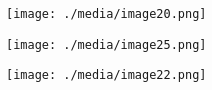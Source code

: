 \documentclass[12pt]{article}
\renewcommand{\_}{\kern-1.5pt\textunderscore\kern-1.5pt}
\begin{document}

\par


\vspace{\baselineskip}

\vspace{\baselineskip}



\begin{figure}[H]
	\begin{FlushLeft}		\texttt{[image: ./media/image20.png]}
	\end{FlushLeft}\end{figure}



\par


\vspace{\baselineskip}

\vspace{\baselineskip}



\begin{figure}[H]
	\begin{FlushLeft}		\texttt{[image: ./media/image25.png]}
	\end{FlushLeft}\end{figure}



\par


\vspace{\baselineskip}



\begin{figure}[H]
	\begin{FlushLeft}		\texttt{[image: ./media/image22.png]}
	\end{FlushLeft}\end{figure}



\par
\end{document}
